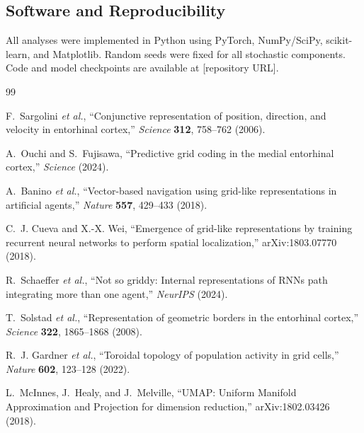 \documentclass[11pt]{article}
\begin{document}

\subsection*{Software and Reproducibility}

All analyses were implemented in Python using PyTorch, NumPy/SciPy, scikit-learn, and Matplotlib. Random seeds were fixed for all stochastic components. Code and model checkpoints are available at [repository URL].


\begin{thebibliography}{99}

F.~Sargolini \textit{et al.},
``Conjunctive representation of position, direction, and velocity in entorhinal cortex,''
\textit{Science} \textbf{312}, 758--762 (2006).

A.~Ouchi and S.~Fujisawa,
``Predictive grid coding in the medial entorhinal cortex,''
\textit{Science} (2024).

A.~Banino \textit{et al.},
``Vector-based navigation using grid-like representations in artificial agents,''
\textit{Nature} \textbf{557}, 429--433 (2018).

C.~J. Cueva and X.-X. Wei,
``Emergence of grid-like representations by training recurrent neural networks to perform spatial localization,''
arXiv:1803.07770 (2018).

R.~Schaeffer \textit{et al.},
``Not so griddy: Internal representations of RNNs path integrating more than one agent,''
\textit{NeurIPS} (2024).

T.~Solstad \textit{et al.},
``Representation of geometric borders in the entorhinal cortex,''
\textit{Science} \textbf{322}, 1865--1868 (2008).

R.~J. Gardner \textit{et al.},
``Toroidal topology of population activity in grid cells,''
\textit{Nature} \textbf{602}, 123--128 (2022).

L.~McInnes, J.~Healy, and J.~Melville,
``UMAP: Uniform Manifold Approximation and Projection for dimension reduction,''
arXiv:1802.03426 (2018).

\end{thebibliography}
\end{document}
